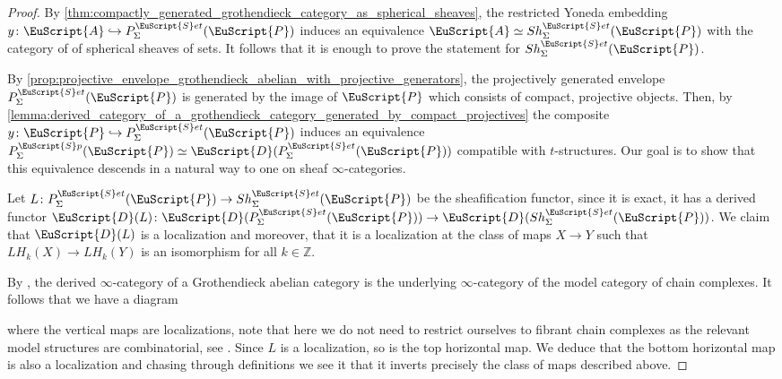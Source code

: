 \documentclass[oneside,a4paper]{amsart}
\newcommand{\euscr}[1]{\EuScript{#1}} %
\newcommand{\acat}{\euscr{A}} %
\newcommand{\dcat}{\euscr{D}} %
\newcommand{\pcat}{\euscr{P}} %
\newcommand{\spectra}{\euscr{S}p} %
\newcommand{\sets}{\euscr{S}et} %
\theoremstyle{plain}
\theoremstyle{definition}
\theoremstyle{remark}
\begin{document}
\begin{proof}
By \cref{thm:compactly_generated_grothendieck_category_as_spherical_sheaves}, the restricted Yoneda embedding $y \colon \acat \hookrightarrow P_{\Sigma}^{\sets}(\pcat)$ induces an equivalence $\acat \simeq Sh_{\Sigma}^{\sets}(\pcat)$ with the category of of spherical sheaves of sets. It follows that it is enough to prove the statement for $Sh_{\Sigma}^{\sets}(\pcat)$. 

By \cref{prop:projective_envelope_grothendieck_abelian_with_projective_generators}, the projectively generated envelope $P_{\Sigma}^{\sets}(\pcat)$ is generated by the image of $\pcat$ which consists of compact, projective objects. Then, by \cref{lemma:derived_category_of_a_grothendieck_category_generated_by_compact_projectives} the composite $y \colon \pcat \hookrightarrow P_{\Sigma}^{\sets}(\pcat)$ induces an equivalence $P_{\Sigma}^{\spectra}(\pcat) \simeq \dcat(P_{\Sigma}^{\sets}(\pcat))$ compatible with $t$-structures. Our goal is to show that this equivalence descends in a natural way to one on sheaf $\infty$-categories. 

Let $L \colon P_{\Sigma}^{\sets}(\pcat) \rightarrow Sh_{\Sigma}^{\sets}(\pcat)$ be the sheafification functor, since it is exact, it has a derived functor $\dcat(L) \colon \dcat(P_{\Sigma}^{\sets}(\pcat)) \rightarrow \dcat(Sh_{\Sigma}^{\sets}(\pcat))$. We claim that $\dcat(L)$ is a localization and moreover, that it is a localization at the class of maps $X \rightarrow Y$ such that $LH_{k}(X) \rightarrow LH_{k}(Y)$ is an isomorphism for all $k \in \mathbb{Z}$. 

By \cite[1.3.5.15]{higher_algebra}, the derived $\infty$-category of a Grothendieck abelian category is the underlying $\infty$-category of the model category of chain complexes. It follows that we have a diagram 

\begin{center}
\end{center}
where the vertical maps are localizations, note that here we do not need to restrict ourselves to fibrant chain complexes as the relevant model structures are combinatorial, see \cite[1.3.4.15]{higher_algebra}. Since $L$ is a localization, so is the top horizontal map. We deduce that the bottom horizontal map is also a localization and chasing through definitions we see it that it inverts precisely the class of maps described above. 


\end{proof}
\end{document}
